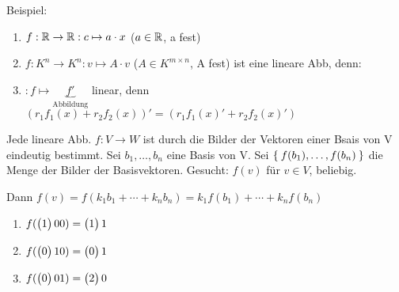 \documentclass{../tudscript}
\begin{document}
\setcounter{section}{1}


        Beispiel:
        \begin{enumerate}
            \item $f: \mathbb{R} \rightarrow\mathbb{R}: c \mapsto a \cdot x$ ($a \in \mathbb{R}$, a fest)
            \item $f: K^n \rightarrow K^n: v \mapsto A \cdot v$ ($A \in K^{m \times n}$, A fest) ist eine lineare Abb, denn:
            \item $: f \mapsto \underbrace{f'}_{\text{Abbildung}}$ linear, denn $(r_1 f_1 (x) + r_2 f_2 (x))' = (r_1 f_1 (x)' + r_2 f_2 (x)')$

        \end{enumerate}
        Jede lineare Abb. $f: V \rightarrow W$ ist durch die Bilder der Vektoren einer Bsais von V eindeutig bestimmt.
        Sei $b_1, \ldots, b_n$ eine Basis von V. Sei $\Set{f (b_1), \ldots, f (b_n)}$ die Menge der Bilder der Basisvektoren.
        Gesucht: $f (v)$ für $v \in V$, beliebig.

        Dann $f(v) = f(k_1 b_1 + \cdots + k_n b_n) = k_1 f(b_1) + \cdots + k_n f(b_n)$


        

        \begin{enumerate}
            \item $f(\begin{pmatrix}1\end{pmatrix}{0}{0}) = \begin{pmatrix}1\end{pmatrix}{1}$
            \item $f(\begin{pmatrix}0\end{pmatrix}{1}{0}) = \begin{pmatrix}0\end{pmatrix}{1}$
            \item $f(\begin{pmatrix}0\end{pmatrix}{0}{1}) = \begin{pmatrix}2\end{pmatrix}{0}$
        \end{enumerate}
        
\end{document}
